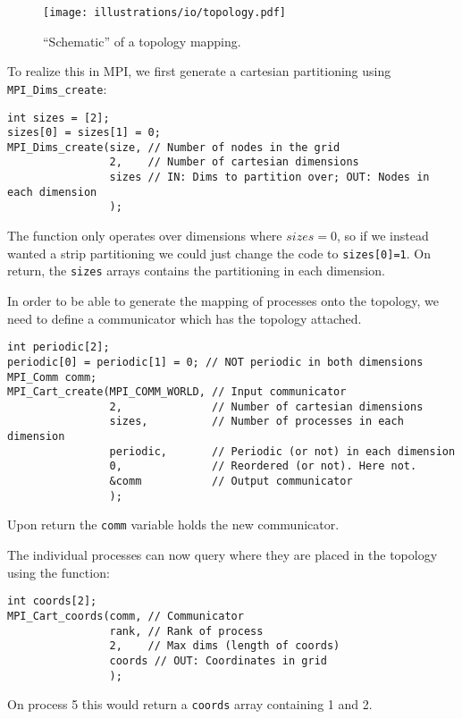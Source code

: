 \begin{figure}[htbp]
  \centering
  \texttt{[image: illustrations/io/topology.pdf]}
  \caption{``Schematic'' of a topology mapping.}
  \label{fig:topology}
\end{figure}

To realize this in MPI, we first generate a cartesian partitioning using \texttt{MPI\_Dims\_create}:
\begin{lstlisting}
int sizes = [2];
sizes[0] = sizes[1] = 0;
MPI_Dims_create(size, // Number of nodes in the grid
                2,    // Number of cartesian dimensions
                sizes // IN: Dims to partition over; OUT: Nodes in each dimension
                );
\end{lstlisting}
The function only operates over dimensions where $sizes=0$, so if we instead wanted a strip partitioning we could just change the code to \texttt{sizes[0]=1}. On return, the \texttt{sizes} arrays contains the partitioning in each dimension.

In order to be able to generate the mapping of processes onto the topology, we need to define a communicator which has the topology attached.
\begin{lstlisting}
int periodic[2];
periodic[0] = periodic[1] = 0; // NOT periodic in both dimensions
MPI_Comm comm;
MPI_Cart_create(MPI_COMM_WORLD, // Input communicator
                2,              // Number of cartesian dimensions
                sizes,          // Number of processes in each dimension
                periodic,       // Periodic (or not) in each dimension
                0,              // Reordered (or not). Here not.
                &comm           // Output communicator
                );
\end{lstlisting}
Upon return the \texttt{comm} variable holds the new communicator.

The individual processes can now query where they are placed in the topology using the function:
\begin{lstlisting}
int coords[2];
MPI_Cart_coords(comm, // Communicator
                rank, // Rank of process
                2,    // Max dims (length of coords)
                coords // OUT: Coordinates in grid
                );
\end{lstlisting}
On process 5 this would return a \texttt{coords} array containing 1 and 2.

